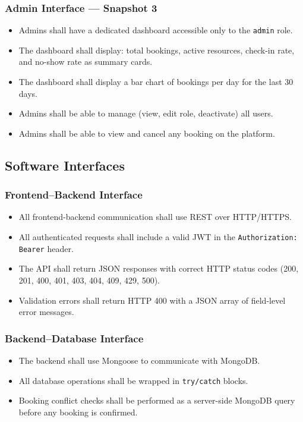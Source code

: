 \documentclass[12pt]{article}
\begin{document}
\subsubsection{Admin Interface --- Snapshot 3}
\begin{itemize}
    \item Admins shall have a dedicated dashboard accessible only to the \texttt{admin} role.
    \item The dashboard shall display: total bookings, active resources, check-in rate, and no-show rate as summary cards.
    \item The dashboard shall display a bar chart of bookings per day for the last 30 days.
    \item Admins shall be able to manage (view, edit role, deactivate) all users.
    \item Admins shall be able to view and cancel any booking on the platform.
\end{itemize}

\subsection{Software Interfaces}

\subsubsection{Frontend--Backend Interface}
\begin{itemize}
    \item All frontend-backend communication shall use REST over HTTP/HTTPS.
    \item All authenticated requests shall include a valid JWT in the \texttt{Authorization: Bearer} header.
    \item The API shall return JSON responses with correct HTTP status codes (200, 201, 400, 401, 403, 404, 409, 429, 500).
    \item Validation errors shall return HTTP 400 with a JSON array of field-level error messages.
\end{itemize}

\subsubsection{Backend--Database Interface}
\begin{itemize}
    \item The backend shall use Mongoose to communicate with MongoDB.
    \item All database operations shall be wrapped in \texttt{try/catch} blocks.
    \item Booking conflict checks shall be performed as a server-side MongoDB query before any booking is confirmed.
\end{itemize}
\end{document}

